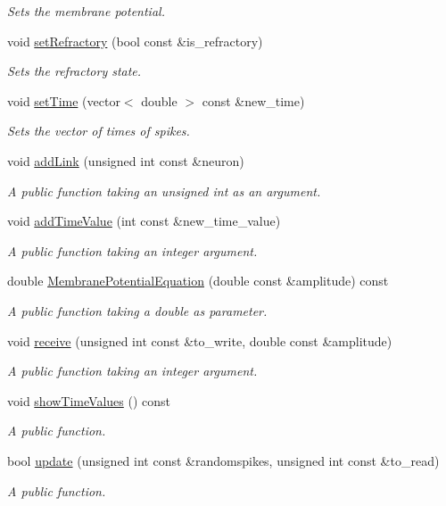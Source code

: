 \begin{DoxyCompactItemize}
\begin{DoxyCompactList}\small\item\em Sets the membrane potential. \end{DoxyCompactList}\item 
void \hyperlink{classNeuron_a32570ad7514c315829559378fbc359bc}{set\-Refractory} (bool const \&is\-\_\-refractory)
\begin{DoxyCompactList}\small\item\em Sets the refractory state. \end{DoxyCompactList}\item 
void \hyperlink{classNeuron_a3fd1e5b3fcc9c7a36ab78c330a29e4f8}{set\-Time} (vector$<$ double $>$ const \&new\-\_\-time)
\begin{DoxyCompactList}\small\item\em Sets the vector of times of spikes. \end{DoxyCompactList}\item 
void \hyperlink{classNeuron_a6468e6ea9f34e7ce0414018c0ca52a1c}{add\-Link} (unsigned int const \&neuron)
\begin{DoxyCompactList}\small\item\em A public function taking an unsigned int as an argument. \end{DoxyCompactList}\item 
void \hyperlink{classNeuron_a19391173c3640f1c41ede531574ef9be}{add\-Time\-Value} (int const \&new\-\_\-time\-\_\-value)
\begin{DoxyCompactList}\small\item\em A public function taking an integer argument. \end{DoxyCompactList}\item 
double \hyperlink{classNeuron_a3f673331282b347a4707eb7f8f20c34c}{Membrane\-Potential\-Equation} (double const \&amplitude) const 
\begin{DoxyCompactList}\small\item\em A public function taking a double as parameter. \end{DoxyCompactList}\item 
void \hyperlink{classNeuron_aa9a049a8a1f452535cea30b7f0c3f098}{receive} (unsigned int const \&to\-\_\-write, double const \&amplitude)
\begin{DoxyCompactList}\small\item\em A public function taking an integer argument. \end{DoxyCompactList}\item 
void \hyperlink{classNeuron_ac13c55318bd649c28cea12c74e6e134e}{show\-Time\-Values} () const 
\begin{DoxyCompactList}\small\item\em A public function. \end{DoxyCompactList}\item 
bool \hyperlink{classNeuron_a89ba2df0157a060f1c1be96479f7c3ed}{update} (unsigned int const \&randomspikes, unsigned int const \&to\-\_\-read)
\begin{DoxyCompactList}\small\item\em A public function. \end{DoxyCompactList}\end{DoxyCompactItemize}
